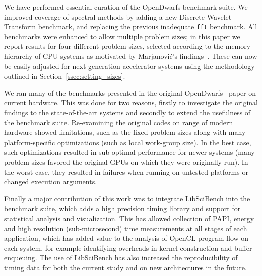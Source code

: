 \documentclass[../document.tex]{subfiles}
\begin{document}
\label{sec:conclusions}

We have performed essential curation of the OpenDwarfs benchmark suite.
We improved coverage of spectral methods by adding a new Discrete Wavelet Transform benchmark, and replacing the previous inadequate {\tt fft} benchmark.
All benchmarks were enhanced to allow multiple problem sizes; in this paper we report results for four different problem sizes, selected according to the memory hierarchy of CPU systems as motivated by Marjanovi{\'c}'s findings~\cite{marjanovic2016hpc}.
These can now be easily adjusted for next generation accelerator systems using the methodology outlined in Section~\ref{ssec:setting_sizes}.

We ran many of the benchmarks presented in the original OpenDwarfs~\cite{krommydas2016opendwarfs} paper on current hardware.
This was done for two reasons, firstly to investigate the original findings to the state-of-the-art systems and secondly to extend the usefulness of the benchmark suite.
Re-examining the original codes on range of modern hardware showed limitations, such as the fixed problem sizes along with many platform-specific optimizations (such as local work-group size).
In the best case, such optimizations resulted in sub-optimal performance for newer systems (many problem sizes favored the original GPUs on which they were originally run).
In the worst case, they resulted in failures when running on untested platforms or changed execution arguments.

Finally a major contribution of this work was to integrate LibSciBench into the benchmark suite, which adds a high precision timing library and support for statistical analysis and visualization.
This has allowed collection of PAPI, energy and high resolution (sub-microsecond) time measurements at all stages of each application, which has added value to the analysis of OpenCL program flow on each system, for example identifying overheads in kernel construction and buffer enqueuing.
The use of LibSciBench has also increased the reproducibility of timing data for both the current study and on new architectures in the future.
\end{document}
